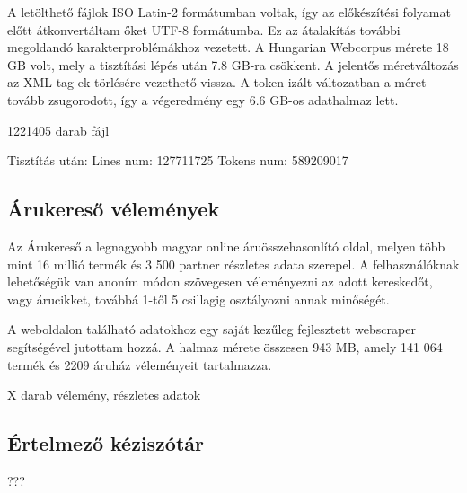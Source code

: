 A letölthető fájlok ISO Latin-2 formátumban voltak, így az előkészítési folyamat előtt átkonvertáltam őket UTF-8 formátumba. Ez az átalakítás további megoldandó karakterproblémákhoz vezetett. A Hungarian Webcorpus mérete 18 GB volt, mely a tisztítási lépés után 7.8 GB-ra csökkent. A jelentős méretváltozás az XML tag-ek törlésére vezethető vissza. A token-izált változatban a méret tovább zsugorodott, így a végeredmény egy 6.6 GB-os adathalmaz lett.

1221405 darab fájl

Tisztítás után:
Lines num: 127711725
Tokens num: 589209017


\subsection{Árukereső vélemények}
Az Árukereső a legnagyobb magyar online áruösszehasonlító oldal, melyen több mint 16 millió termék és 3 500 partner részletes adata szerepel. A felhasználóknak lehetőségük van anoním módon szövegesen véleményezni az adott kereskedőt, vagy árucikket, továbbá 1-től 5 csillagig osztályozni annak minőségét.

A weboldalon található adatokhoz egy saját kezűleg fejlesztett webscraper segítségével jutottam hozzá. A halmaz mérete összesen 943 MB, amely 141 064 termék és 2209 áruház véleményeit tartalmazza.

X darab vélemény, 
részletes adatok


\subsection{Értelmező kéziszótár}

???





